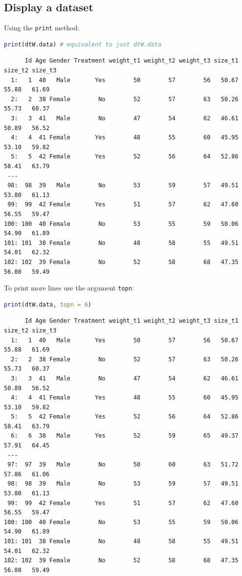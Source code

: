 \documentclass{article}
\begin{document}
\subsection{Display a dataset}
\label{sec:orgb3fff2b}

Using the \texttt{print} method:
\begin{lstlisting}[language=r,numbers=none]
print(dtW.data) # equivalent to just dtW.data
\end{lstlisting}

\label{}
\begin{verbatim}
      Id Age Gender Treatment weight_t1 weight_t2 weight_t3 size_t1 size_t2 size_t3
  1:   1  40   Male       Yes        50        57        56   50.67   55.88   61.69
  2:   2  38 Female        No        52        57        63   50.26   55.73   60.37
  3:   3  41   Male        No        47        54        62   46.61   50.89   56.52
  4:   4  41 Female       Yes        48        55        60   45.95   53.10   59.82
  5:   5  42 Female       Yes        52        56        64   52.86   58.41   63.79
 ---                                                                               
 98:  98  39   Male        No        53        59        57   49.51   53.80   61.13
 99:  99  42 Female       Yes        51        57        62   47.60   56.55   59.47
100: 100  40 Female        No        53        55        59   50.06   54.90   61.89
101: 101  38 Female        No        48        58        55   49.51   54.01   62.32
102: 102  39 Female        No        52        58        68   47.35   56.08   59.49
\end{verbatim}

To print more lines use the argument \texttt{topn}:
\begin{lstlisting}[language=r,numbers=none]
print(dtW.data, topn = 6)
\end{lstlisting}

\label{}
\begin{verbatim}
      Id Age Gender Treatment weight_t1 weight_t2 weight_t3 size_t1 size_t2 size_t3
  1:   1  40   Male       Yes        50        57        56   50.67   55.88   61.69
  2:   2  38 Female        No        52        57        63   50.26   55.73   60.37
  3:   3  41   Male        No        47        54        62   46.61   50.89   56.52
  4:   4  41 Female       Yes        48        55        60   45.95   53.10   59.82
  5:   5  42 Female       Yes        52        56        64   52.86   58.41   63.79
  6:   6  38   Male       Yes        52        59        65   49.37   57.91   64.45
 ---                                                                               
 97:  97  39   Male        No        50        60        63   51.72   57.86   61.06
 98:  98  39   Male        No        53        59        57   49.51   53.80   61.13
 99:  99  42 Female       Yes        51        57        62   47.60   56.55   59.47
100: 100  40 Female        No        53        55        59   50.06   54.90   61.89
101: 101  38 Female        No        48        58        55   49.51   54.01   62.32
102: 102  39 Female        No        52        58        68   47.35   56.08   59.49
\end{verbatim}
\end{document}
